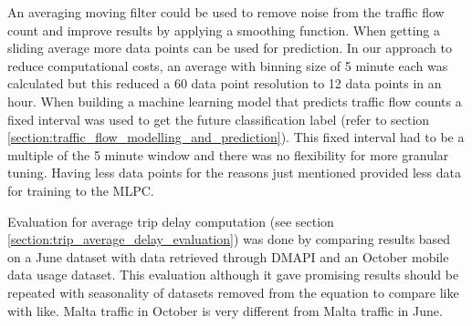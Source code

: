 \documentclass[12pt, a4paper]{report}
\theoremstyle{definition}
\theoremstyle{definition}%
\theoremstyle{definition}%
\theoremstyle{definition}%
\theoremstyle{definition}%
\theoremstyle{definition}%
\begin{document}
An averaging moving filter could be used to remove noise from the traffic flow count and improve results by applying a smoothing function. When getting a sliding average more data points can be used for prediction. In our approach to reduce computational costs, an average with binning size of 5 minute each was calculated but this reduced a 60 data point resolution to 12 data points in an hour. When building a machine learning model that predicts traffic flow counts a fixed interval was used to get the future classification label (refer to section \ref{section:traffic_flow_modelling_and_prediction}). This fixed interval had to be a multiple of the 5 minute window and there was no flexibility for more granular tuning. Having less data points for the reasons just mentioned provided less data for training to the MLPC.


Evaluation for average trip delay computation (see section \ref{section:trip_average_delay_evaluation}) was done by comparing results based on a June dataset with data retrieved through DMAPI and an October mobile data usage dataset. This evaluation although it gave promising results should be repeated with seasonality of datasets removed from the equation to compare like with like. Malta traffic in October is very different from Malta traffic in June. 






\bibliomatter

 
 
\end{document}
